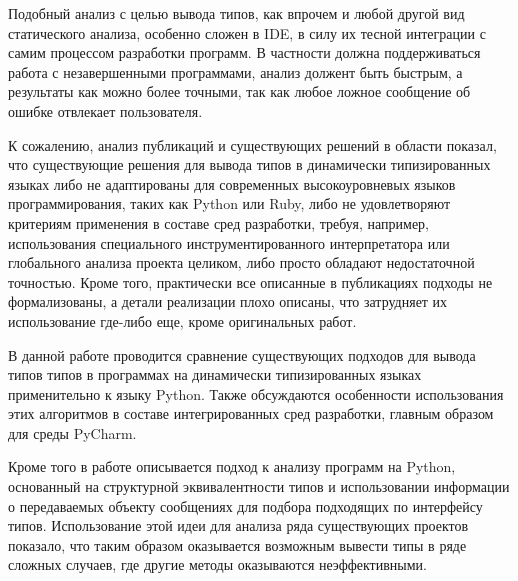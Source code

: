 Подобный анализ с целью вывода типов, как впрочем и любой другой вид
статического анализа, особенно сложен в IDE, в силу их тесной
интеграции с самим процессом разработки программ. В частности должна
поддерживаться работа с незавершенными программами, анализ должент быть быстрым,
а результаты как можно более точными, так как любое ложное сообщение об ошибке
отвлекает пользователя.

К сожалению, анализ публикаций и существующих решений в области показал, что
существующие решения для вывода типов в динамически типизированных языках либо
не адаптированы для современных высокоуровневых языков программирования, таких
как Python или Ruby, либо не удовлетворяют критериям применения в составе сред
разработки, требуя, например, использования специального инструментированного
интерпретатора или глобального анализа проекта целиком, либо просто
обладают недостаточной точностью. Кроме того, практически все описанные в публикациях
подходы не формализованы, а детали реализации плохо описаны, что
затрудняет их использование где-либо еще, кроме оригинальных работ. 

В данной работе проводится сравнение существующих подходов для
вывода типов типов в программах на динамически типизированных языках
применительно к языку Python. Также обсуждаются особенности использования этих
алгоритмов в составе интегрированных сред разработки, главным образом для среды
PyCharm.

Кроме того в работе описывается подход к анализу программ на Python, основанный
на структурной эквивалентности типов и использовании информации о передаваемых
объекту сообщениях для подбора подходящих по интерфейсу типов. Использование
этой идеи для анализа ряда существующих проектов показало, что таким
образом оказывается возможным вывести типы в ряде сложных случаев, где другие
методы оказываются неэффективными.



